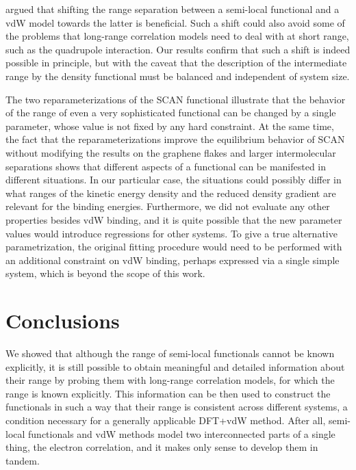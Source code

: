 \citet{PengPRX16} argued that shifting the range separation between a semi-local functional and a vdW model towards the latter is beneficial.
Such a shift could also avoid some of the problems that long-range correlation models need to deal with at short range, such as the quadrupole interaction.
Our results confirm that such a shift is indeed possible in principle, but with the caveat that the description of the intermediate range by the density functional must be balanced and independent of system size.

The two reparameterizations of the SCAN functional illustrate that the behavior of the range of even a very sophisticated functional can be changed by a single parameter, whose value is not fixed by any hard constraint.
At the same time, the fact that the reparameterizations improve the equilibrium behavior of SCAN without modifying the results on the graphene flakes and larger intermolecular separations shows that different aspects of a functional can be manifested in different situations.
In our particular case, the situations could possibly differ in what ranges of the kinetic energy density and the reduced density gradient are relevant for the binding energies.
Furthermore, we did not evaluate any other properties besides vdW binding, and it is quite possible that the new parameter values would introduce regressions for other systems.
To give a true alternative parametrization, the original fitting procedure would need to be performed with an additional constraint on vdW binding, perhaps expressed via a single simple system, which is beyond the scope of this work.

\section{Conclusions}

We showed that although the range of semi-local functionals cannot be known explicitly, it is still possible to obtain meaningful and detailed information about their range by probing them with long-range correlation models, for which the range is known explicitly.
This information can be then used to construct the functionals in such a way that their range is consistent across different systems, a condition necessary for a generally applicable DFT+vdW method.
After all, semi-local functionals and vdW methods model two interconnected parts of a single thing, the electron correlation, and it makes only sense to develop them in tandem.
